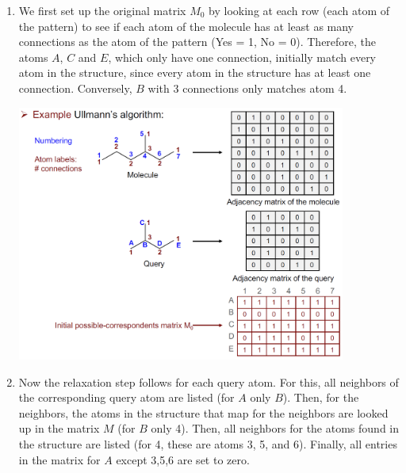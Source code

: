 \begin{enumerate}
    \item We first set up the original matrix $M_0$ by looking at each row (each atom of the pattern) to see if each atom of the molecule has at least as many connections as the atom of the pattern (Yes = 1, No = 0). Therefore, the atoms $A$, $C$ and $E$, which only have one connection, initially match every atom in the structure, since every atom in the structure has at least one connection. Conversely, $B$ with 3 connections only matches atom 4.
    \begin{center}\includegraphics[width=0.85\textwidth]{img/cheminformatics/UllmannInitialMatrix.png}\end{center}
    \item Now the relaxation step follows for each query atom. For this, all neighbors of the corresponding query atom are listed (for $A$ only $B$). Then, for the neighbors, the atoms in the structure that map for the neighbors are looked up in the matrix $M$ (for $B$ only 4). Then, all neighbors for the atoms found in the structure are listed (for 4, these are atoms 3, 5, and 6). Finally, all entries in the matrix for $A$ except 3,5,6 are set to zero.

\end{enumerate}
